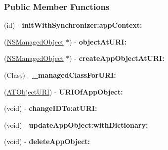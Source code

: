 \subsubsection*{Public Member Functions}
\begin{DoxyCompactItemize}
\item 
\hypertarget{interface_a_t_app_context_a7e4fa14a4fba295c242147d0833ebfed}{
(id) -\/ {\bfseries initWithSynchronizer:appContext:}}
\label{interface_a_t_app_context_a7e4fa14a4fba295c242147d0833ebfed}

\item 
\hypertarget{interface_a_t_app_context_a94a02a8d89c8ae918d7ddb36ba527b48}{
(\hyperlink{class_n_s_managed_object}{NSManagedObject} $\ast$) -\/ {\bfseries objectAtURI:}}
\label{interface_a_t_app_context_a94a02a8d89c8ae918d7ddb36ba527b48}

\item 
\hypertarget{interface_a_t_app_context_a21b9499e171d899e7aecb70b582182ba}{
(\hyperlink{class_n_s_managed_object}{NSManagedObject} $\ast$) -\/ {\bfseries createAppObjectAtURI:}}
\label{interface_a_t_app_context_a21b9499e171d899e7aecb70b582182ba}

\item 
\hypertarget{interface_a_t_app_context_a3df88879a1cacecd35a7bc674f8fe605}{
(Class) -\/ {\bfseries \_\-managedClassForURI:}}
\label{interface_a_t_app_context_a3df88879a1cacecd35a7bc674f8fe605}

\item 
\hypertarget{interface_a_t_app_context_af5b706906b12bbae130ba97a1fd4f233}{
(\hyperlink{struct___a_t_object_u_r_i}{ATObjectURI}) -\/ {\bfseries URIOfAppObject:}}
\label{interface_a_t_app_context_af5b706906b12bbae130ba97a1fd4f233}

\item 
\hypertarget{interface_a_t_app_context_a5467ab26d0768fda050e72b7267dd4f2}{
(void) -\/ {\bfseries changeIDTo:atURI:}}
\label{interface_a_t_app_context_a5467ab26d0768fda050e72b7267dd4f2}

\item 
\hypertarget{interface_a_t_app_context_ab4b436e64d15f8d25d3f186479e4cf7d}{
(void) -\/ {\bfseries updateAppObject:withDictionary:}}
\label{interface_a_t_app_context_ab4b436e64d15f8d25d3f186479e4cf7d}

\item 
\hypertarget{interface_a_t_app_context_a2b43c323a64dcef375733da94ee63fd2}{
(void) -\/ {\bfseries deleteAppObject:}}
\label{interface_a_t_app_context_a2b43c323a64dcef375733da94ee63fd2}


\end{DoxyCompactItemize}
